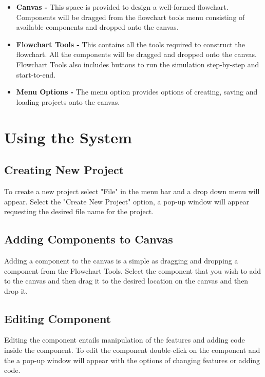 \documentclass[11pt,a4paper,titlepage]{article}
\begin{document}
		\begin{itemize}
			\item \textbf{Canvas -} This space is provided to design a 			well-formed flowchart. Components will be dragged from the flowchart 				tools menu consisting of available components and dropped onto the 				canvas.
			
			\item \textbf{Flowchart Tools -} This contains all the tools 				required to construct the flowchart. All the components will be 			dragged and dropped onto the canvas. Flowchart Tools also includes 				buttons to run the simulation step-by-step and start-to-end.
			
			\item \textbf{Menu Options -} The menu option provides options of 				creating, saving and loading projects onto the canvas.
			
		\end{itemize}
	
	\newpage
\section{Using the System}
	\subsection{Creating New Project}
	
		To create a new project select "File" in the menu bar and a drop down menu will appear. Select the "Create New Project" option, a pop-up window will appear requesting the desired file name for the project.
		
		
	\subsection{Adding Components to Canvas}
	
	Adding a component to the canvas is a simple as dragging and dropping a component from the Flowchart Tools. Select the component that you wish to add to the canvas and then drag it to the desired location on the canvas and then drop it.
	
	\subsection{Editing Component}
	
	Editing the component entails manipulation of the features and adding code inside the component. To edit the component double-click on the component and the a pop-up window will appear with the options of changing features or adding code.
		
\end{document}
